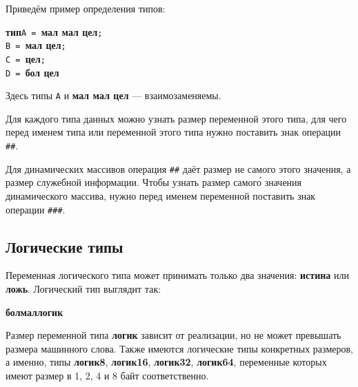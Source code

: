 \documentclass[10pt]{report}
\begin{document}
Приведём пример определения типов:

\noindent\textbf{тип}\phantom{m}\texttt{A = }\textbf{мал мал цел}\texttt{;}\\
\phantom{типm|}\texttt{B = }\textbf{мал цел}\texttt{;}\\
\phantom{типm|}\texttt{C = }\textbf{цел}\texttt{;}\\
\phantom{типm|}\texttt{D = }\textbf{бол цел}

Здесь типы \texttt{A} и \textbf{мал мал цел} --- взаимозаменяемы.

Для каждого типа данных можно узнать размер переменной этого типа, для чего перед именем типа или переменной этого типа нужно поставить знак операции \texttt{\#\#}.

Для динамических массивов операция \texttt{\#\#} даёт размер не самого этого значения, а размер служебной информации. Чтобы узнать размер самог\'{о}
значения динамического массива, нужно перед именем переменной поставить знак операции \texttt{\#\#\#}.

\subsection{Логические типы}

Переменная логического типа может принимать только два значения: \textbf{истина} или \textbf{ложь}. Логический тип выглядит так:
\begin{center}
	\rbo\textbf{бол}\sor\textbf{мал}\rbc\kleene \textbf{логик}
\end{center}

Размер переменной типа \textbf{логик} зависит от реализации, но не может превышать размера машинного слова. Также имеются логические типы конкретных размеров, а именно, типы \textbf{логик8}, \textbf{логик16},
\textbf{логик32}, \textbf{логик64}, переменные которых имеют размер в 1, 2, 4 и 8 байт соответственно.
\end{document}
